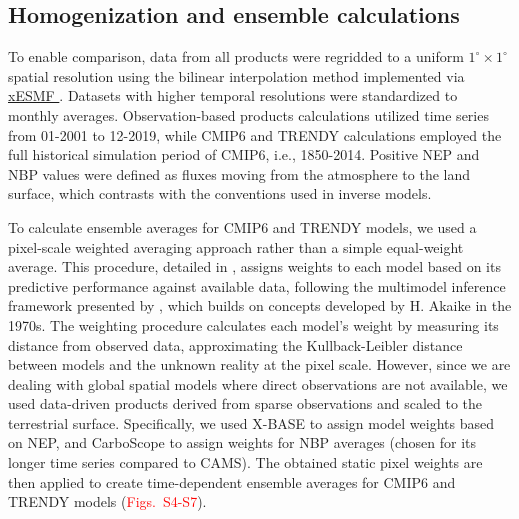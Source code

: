 \documentclass[ProofPDF]{./Styles/Jnls-Template-V3}
\begin{document}

\subsection{Homogenization and ensemble calculations}
To enable comparison, data from all products were regridded to a uniform $1^\circ\times1^\circ$ spatial resolution using the bilinear interpolation method implemented via \hyperlink{https://xesmf.readthedocs.io/}{xESMF \citep{zhuang2023}}. Datasets with higher temporal resolutions were standardized to monthly averages. Observation-based products calculations utilized time series from 01-2001 to 12-2019, while CMIP6 and TRENDY calculations employed the full historical simulation period of CMIP6, i.e., 1850-2014. Positive NEP and NBP values were defined as fluxes moving from the atmosphere to the land surface, which contrasts with the conventions used in inverse models.

To calculate ensemble averages for CMIP6 and TRENDY models, we used a pixel-scale weighted averaging approach rather than a simple equal-weight average. This procedure, detailed in \citet{Sierra2025GDM}, assigns weights to each model based on its predictive performance against available data, following the multimodel inference framework presented by \citet{Burnham2002}, which builds on concepts developed by H. Akaike in the 1970s. The weighting procedure calculates each model's weight by measuring its distance from observed data, approximating the Kullback-Leibler distance between models and the unknown reality at the pixel scale. However, since we are dealing with global spatial models where direct observations are not available, we used data-driven products derived from sparse observations and scaled to the terrestrial surface. Specifically, we used X-BASE to assign model weights based on NEP, and CarboScope to assign weights for NBP averages (chosen for its longer time series compared to CAMS). The obtained static pixel weights are then applied to create time-dependent ensemble averages for CMIP6 and TRENDY models (\textcolor{red}{Figs.~S4-S7}).

 
\end{document}
